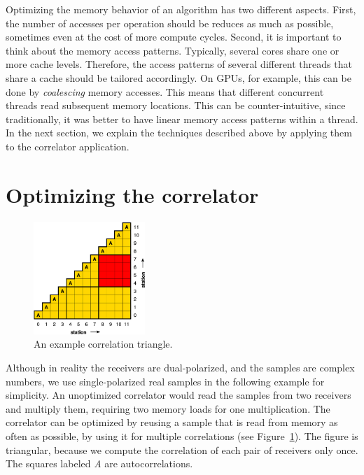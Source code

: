 \documentclass{article}
\begin{document}
Optimizing the memory behavior of an algorithm has two different
aspects.  First, the number of accesses per operation should be
reduces as much as possible, sometimes even at the cost of more
compute cycles.  Second, it is important to think about the memory
access patterns. Typically, several cores share one or more cache
levels. Therefore, the access patterns of several different threads
that share a cache should be tailored accordingly. On GPUs, for
example, this can be done by \emph{coalescing} memory accesses.  This
means that different concurrent threads read subsequent memory
locations.  This can be counter-intuitive, since traditionally, it was
better to have linear memory access patterns within a thread.  In the
next section, we explain the techniques described above by applying
them to the correlator application.


\section{Optimizing the correlator}

\begin{figure}[t]
\begin{center}
\includegraphics[width=4.2cm]{figures/correlation-triangle.pdf}
\end{center}
\vspace{-0.5cm}
\caption{An example correlation triangle.}
\label{fig-correlation}
\end{figure}

Although in reality the receivers are dual-polarized, and the samples are complex numbers, 
we use single-polarized real samples in the following example for simplicity.
An unoptimized correlator would read the samples from two receivers and
multiply them, requiring two memory loads for one multiplication.
The correlator can be optimized by reusing a sample that is read from memory
as often as possible, by using it for multiple correlations (see
Figure~\ref{fig-correlation}).
The figure is triangular, because we compute
the correlation of each pair of receivers only once. The squares labeled \emph{A} are
autocorrelations.
\end{document}
